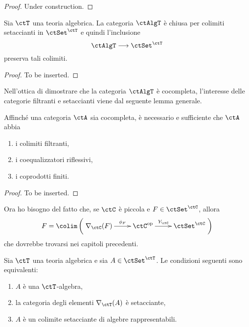 \begin{proof}
	Under construction.
\end{proof}

\begin{proposition}\label{prop_colim_sift_AlgT}
	Sia \(\ctT\) una teoria algebrica. La categoria \(\ctAlgT\) è chiusa per colimiti setaccianti in \(\ctSet^{\ctT}\) e quindi l'inclusione
	\[
		\ctAlgT \fun \ctSet^{\ctT}
	\]
	preserva tali colimiti.
\end{proposition}

\begin{proof}
	To be inserted.
\end{proof}

Nell'ottica di dimostrare che la categoria \(\ctAlgT\) è cocompleta, l'interesse delle categorie filtranti e setaccianti viene dal
seguente lemma generale.

\begin{lemma}\label{lemma_cocompl_sift}
	Affinché una categoria \(\ctA\) sia cocompleta, è necessario e sufficiente che \(\ctA\) abbia
	\begin{enumerate}
		\item i colimiti filtranti,
		\item i coequalizzatori riflessivi,
		\item i coprodotti finiti.
	\end{enumerate}
\end{lemma}

\begin{proof}
	To be inserted.
\end{proof}

\begin{warning}\label{caveat_colim_rappr}
	Ora ho bisogno del fatto che, se \(\ctC\) è piccola e \(F \in \ctSet^{\ctC}\), allora
	\[
		F = \colim\left(\xymatrix{\Elts\ctC F \ar[r]^-{\phi_F} & \ctC^{\mathrm{op}} \ar[r]^-{Y_{\ctC}} & \ctSet^{\ctC}}\right)
	\]
	che dovrebbe trovarsi nei capitoli precedenti.
\end{warning}

\begin{lemma}\label{lemma_alg_sift_rapp}
	Sia \(\ctT\) una teoria algebrica e sia \(A \in \ctSet^{\ctT}\). Le condizioni seguenti sono equivalenti:
	\begin{enumerate}
		\item \(A\) è una \(\ctT\)-algebra,
		\item la categoria degli elementi \(\Elts{\ctT}A\) è setacciante,
		\item \(A\) è un colimite setacciante di algebre rappresentabili.
	\end{enumerate}
\end{lemma}

